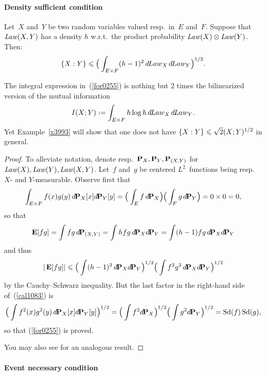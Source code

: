 \paragraph{Density sufficient condition}

\begin{Pro}\label{pro0651}
Let~$X$ and~$Y$ be two random variables valued resp.\ in~$E$ and~$F$.
Suppose that $\operatorname{\mathit{Law}}(X,Y)$ has a density $h$ w.r.t.\ the product probability $\operatorname{\mathit{Law}}(X)\otimes\operatorname{\mathit{Law}}(Y)$.
Then:
\[\label{for0255} \{X:Y\} \leq \Big( \int_{E\times F} (h-1)^2 \,\dx{Law_X}\,\dx{Law_Y} \Big)^{1/2} .\]
\end{Pro}

\begin{Rmk}\label{rmk5108}
The integral expression in~(\ref{for0255})
is nothing but $2$ times the bilinearized version of the mutual information
\[\label{eq9402} I(X;Y) \coloneqq \int_{E\times F} h \ln h \,\dx{Law_X}\,\dx{Law_Y} .\]
Yet Example~\ref{x3993} will show that one does not have
${\{X:Y\}} \leq \sqrt{2} \* (X;Y)^{1/2}$ in general.
\end{Rmk}

\begin{proof}
To alleviate notation, denote resp.~$\mathop{\smash{\mathbf{P}}}\nolimits_X,\allowbreak \mathop{\smash{\mathbf{P}}}\nolimits_Y,\allowbreak \mathop{\smash{\mathbf{P}}}\nolimits_{(X,Y)}$ for~$\operatorname{\mathit{Law}}(X),\allowbreak \operatorname{\mathit{Law}}(Y),\allowbreak \operatorname{\mathit{Law}}(X,Y)$.
Let~$f$ and~$g$ be centered $L^2$~functions being resp.\ $X$- and $Y$-measurable.
Observe first that
\[ \int_{E\times F}f(x)g(y) \,\dx{\Pr_X}[x]\dx{\Pr_Y}[y] =
\Big(\int_E f \,\dx{\Pr_X}\Big) \Big(\int_F g \,\dx{\Pr_Y} \Big) = 0 \times 0 = 0 ,\]
so that
\[ \EE[fg] = \int fg \,\dx{\Pr_{(X,Y)}}
= \int hfg \,\dx{\Pr_X}\dx{\Pr_Y} = \int (h-1)fg \,\dx{\Pr_X}\dx{\Pr_Y} \]
and thus
\[\label{cal1083}
|\EE[fg]| \leq \Big( \int (h-1)^2 \,\dx{\Pr_X}\dx{\Pr_Y} \Big)^{1/2}
\Big( \int f^2 g^2 \,\dx{\Pr_X} \dx{\Pr_Y} \Big)^{1/2} \]
by the Cauchy--Schwarz inequality.
%
But the last factor in the right-hand side of~(\ref{cal1083}) is
\[ \Big( \int f^2(x) g^2(y) \,\dx{\Pr_X}[x] \dx{\Pr_Y}[y] \Big)^{1/2}
= \Big( \int f^2 \dx{\Pr_X} \Big)^{1/2}
\Big( \int g^2 \dx{\Pr_Y} \Big)^{1/2}
= \ecty(f) \ecty(g) ,\]
so that (\ref{for0255}) is proved.

You may also see \cite[Theorem~2.5]{Bryc} for an analogous result.
\end{proof}


\paragraph{Event necessary condition}

